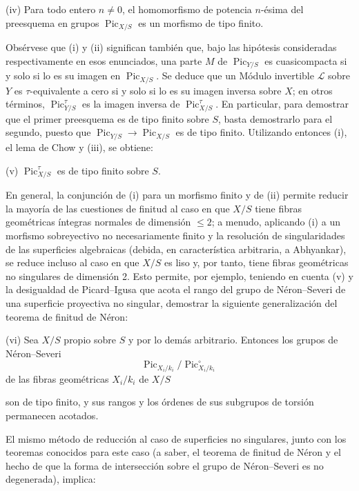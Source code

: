 \documentclass[11pt,twoside,openany]{book}
\numberwithin{equation}{section}
\newcommand{\src}[1]{%
  \phantomsection\hypertarget{src:#1}{}%
  \marginpar{\raggedleft\footnotesize\sffamily #1}%
}
\theoremstyle{plain}
\theoremstyle{definition}
\theoremstyle{remark}
\newcommand{\FgaUnitKey}{frontmatter}
\renewcommand{\src}[1]{%
  \phantomsection\hypertarget{src:\FgaUnitKey:#1}{}%
  \marginpar{\raggedleft\footnotesize\sffamily #1}%
}
\theoremstyle{plain}
\theoremstyle{definition}
\theoremstyle{remark}
\begin{document}
\noindent(iv) Para todo entero $n\neq0$, el homomorfismo de potencia $n$-ésima
del preesquema en grupos $\operatorname{Pic}_{X/S}$ es un morfismo de tipo
finito.

Obsérvese que (i) y (ii) significan también que, bajo las hipótesis
consideradas respectivamente en esos enunciados, una parte $M$ de
$\operatorname{Pic}_{Y/S}$ es cuasicompacta si y solo si lo es su imagen en
$\operatorname{Pic}_{X/S}$. Se deduce que un Módulo invertible $\mathcal L$ sobre
$Y$ es $\tau$-equivalente a cero si y solo si lo es su imagen inversa sobre
$X$; en otros términos, $\operatorname{Pic}_{Y/S}^\tau$ es la imagen inversa
de $\operatorname{Pic}_{X/S}^\tau$. En particular, para demostrar que el
primer preesquema es de tipo finito sobre $S$, basta demostrarlo para el
segundo, puesto que $\operatorname{Pic}_{Y/S}\longrightarrow
\operatorname{Pic}_{X/S}$ es de tipo finito. Utilizando entonces (i), el lema
de Chow y (iii), se obtiene:

\medskip
\noindent(v) $\operatorname{Pic}_{X/S}^\tau$ es de tipo finito sobre $S$.

En general, la conjunción de (i) para un morfismo finito y de (ii) permite
reducir la mayoría de las cuestiones de finitud al caso en que $X/S$ tiene
fibras geométricas íntegras normales de dimensión $\leq2$; a menudo, aplicando
(i) a un morfismo sobreyectivo no necesariamente finito y la resolución de
singularidades de las superficies algebraicas (debida, en característica
arbitraria, a Abhyankar), se reduce incluso al caso en que $X/S$ es liso y,
por tanto, tiene fibras geométricas no singulares de dimensión 2. Esto permite,
por ejemplo, teniendo en cuenta (v) y la desigualdad de Picard--Igusa que
acota el rango del grupo de Néron--Severi de una superficie proyectiva no
singular, demostrar la siguiente generalización del teorema de finitud de
Néron:

\medskip
\noindent(vi) Sea $X/S$ propio sobre $S$ y por lo demás arbitrario. Entonces
los grupos de Néron--Severi
\[
\operatorname{Pic}_{X_i/k_i}/\operatorname{Pic}_{X_i/k_i}^\circ
\]
de las fibras geométricas $X_i/k_i$ de $X/S$

\src{305}
son de tipo finito, y sus rangos y los órdenes de sus subgrupos de torsión
permanecen acotados.

El mismo método de reducción al caso de superficies no singulares, junto con
los teoremas conocidos para este caso (a saber, el teorema de finitud de Néron
y el hecho de que la forma de intersección sobre el grupo de Néron--Severi es
no degenerada), implica:
\end{document}
